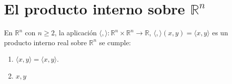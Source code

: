 \documentclass[a4paper]{scrreprt}
\providecommand{\inner}[2]{#1,#2}
\begin{document}
\section{El producto interno sobre $\mathds{R}^{n}$}
En $\mathds{R}^{n}$ con $n\geq2$, la aplicación $\langle,\rangle\colon\mathds{R}^{n}\times\mathds{R}^{n}\rightarrow\mathds{R}$, $\langle,\rangle\left(x,y\right)=\langle x,y\rangle$ es un producto interno real sobre $\mathds{R}^{n}$ se cumple:
\begin{enumerate}
\item $\langle x,y\rangle=\langle x,y\rangle$.
\item $\inner{x}{y}$
\end{enumerate}
  
\end{document}
